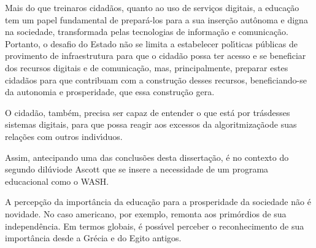 \documentclass[
12pt,		%
openright,	%
twoside,  %
a4paper,			%
chapter=TITLE,		%
english,			%
french,				%
spanish,			%
brazil				%
]{USPSC-classe/USPSC}
\begin{document}
Mais do que \textquotedbl treinar\textquotedbl  os cidad\~aos, quanto ao uso  de servi\c{c}os digitais, a educa\c{c}\~ao tem um papel fundamental de prepar\'a-los para a sua inser\c{c}\~ao aut\^onoma e digna na sociedade, transformada pelas tecnologias de informa\c{c}\~ao e comunica\c{c}\~ao. Portanto, o desafio do Estado n\~ao se limita a estabelecer pol\'{\i}ticas p\'ublicas de provimento de infraestrutura para que o cidad\~ao possa ter acesso e se beneficiar dos recursos digitais e de comunica\c{c}\~ao, mas, principalmente, preparar estes cidad\~aos para que contribuam com a constru\c{c}\~ao desses recursos, beneficiando-se da autonomia e prosperidade, que  essa constru\c{c}\~ao gera.









O cidad\~ao, tamb\'em, precisa ser capaz de entender \textquotedbl o que est\'a por tr\'as\textquotedbl  desses sistemas digitais, para que possa reagir aos excessos da \textquotedbl algoritmiza\c{c}\~ao\textquotedbl  de suas rela\c{c}\~oes com outros indiv\'{\i}duos.









Assim, antecipando  uma das conclus\~oes desta disserta\c{c}\~ao, \'e no contexto do \textquotedbl segundo dil\'uvio\textquotedbl  de Ascott que se insere a necessidade de um programa educacional como o WASH.









A percep\c{c}\~ao da import\^ancia da educa\c{c}\~ao para a prosperidade da sociedade n\~ao \'e novidade. No caso americano, por exemplo, remonta aos prim\'ordios de sua independ\^encia. Em termos globais, \'e poss\'{\i}vel perceber o reconhecimento de sua import\^ancia desde a Gr\'ecia e do Egito antigos.
\end{document}
